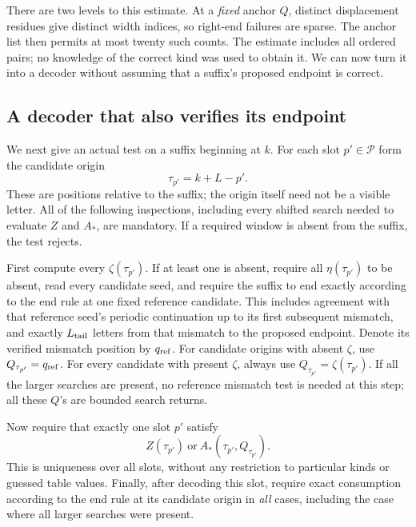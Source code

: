 There are two levels to this estimate. At a \emph{fixed} anchor $Q$,
distinct displacement residues give distinct width indices, so right-end
failures are sparse. The anchor list then permits at most twenty such
counts. The estimate includes all ordered pairs; no knowledge of the
correct kind was used to obtain it. We can now turn it into a decoder
without assuming that a suffix's proposed endpoint is correct.

\subsection{A decoder that also verifies its endpoint}

We next give an actual test on a suffix beginning at $k$.
For each slot $p'\in\mathcal P$ form the candidate origin
\begin{equation}
                        \tau_{p'}=k+L-p'.
 \label{decode:candidate-origins}
\end{equation}
These are positions relative to the suffix; the origin itself
need not be a visible letter.  All of the following inspections,
including every shifted search needed to evaluate $Z$ and $A_*$,
are mandatory.  If a required window is absent from the suffix,
the test rejects.

First compute every $\zeta(\tau_{p'})$.  If at least one is
absent, require all $\eta(\tau_{p'})$ to be absent, read every
candidate seed, and require the suffix to end exactly according
to the end rule at one fixed reference candidate.  This includes
agreement with that reference seed's periodic continuation up
to its first subsequent mismatch, and exactly $L_{\rm tail}$
letters from that mismatch to the proposed endpoint.  Denote
its verified mismatch position by $q_{\rm ref}$.  For candidate
origins with absent $\zeta$, use $Q_{\tau_{p'}}=q_{\rm ref}$.
For every candidate with present $\zeta$, always use
$Q_{\tau_{p'}}=\zeta(\tau_{p'})$.
If all the larger searches are present, no reference mismatch
test is needed at this step; all these $Q$'s are bounded search
returns.

Now require that exactly one slot $p'$ satisfy
\begin{equation}
         Z(\tau_{p'})\ \text{or}\
         A_*(\tau_{p'},Q_{\tau_{p'}}).
 \label{decode:unique-witness}
\end{equation}
This is uniqueness over all slots, without any restriction to
particular kinds or guessed table values.  Finally, after
decoding this slot, require exact consumption according to the
end rule at its candidate origin in \emph{all} cases, including
the case where all larger searches were present.

